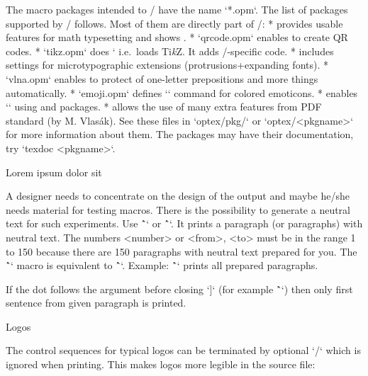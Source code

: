 {The macro packages intended to \OpTeX/ have the name `*.opm`.
The list of packages supported by \OpTeX/ follows. Most of them are directly part of \OpTeX/:
\begitems \typosize[9/11]
* 
  provides usable features for math typesetting and shows
  .
* `qrcode.opm` enables to create QR codes.
* `tikz.opm` does ` i.e.\ loads Ti{\it k\/}Z. It adds \OpTeX/-specific code.
* 
  includes settings for microtypographic extensions (protrusions+expanding fonts).
* `vlna.opm` enables to protect of one-letter prepositions and more things automatically.
* `emoji.opm` defines `` command for colored emoticons.
*  enables
  `\directmetapost` using 
  and  packages.
* 
  allows the use of many extra features from PDF standard (by M. Vlasák).
\enditems
See these files in `optex/pkg/` or `optex/<pkgname>` for more information about
them. The packages may have their documentation, try `texdoc <pkgname>`.

\secc Lorem ipsum dolor sit

\new
A designer needs to concentrate on the design of the output and maybe he/she
needs material for testing macros. There is the possibility to generate a
neutral text for such experiments. Use \^`\lorem[<number>]` or
\^`\lorem[<from>-<to>]`. It prints a paragraph (or paragraphs) with neutral
text. The numbers <number> or <from>, <to> must be in the range 1 to 150
because there are 150 paragraphs with neutral text prepared for you.
The \^`\lipsum` macro is equivalent to \^`\lorem`. Example: \^`\lipsum[1-150]`
prints all prepared paragraphs.

If the dot follows the argument before closing `]` (for example \^`\lipsum[3.]`)
then only first sentence from given paragraph is printed.

\secc Logos

\new
The control sequences for typical logos can be terminated by optional `/`
which is ignored when printing. This makes logos more legible in the source file:

}
